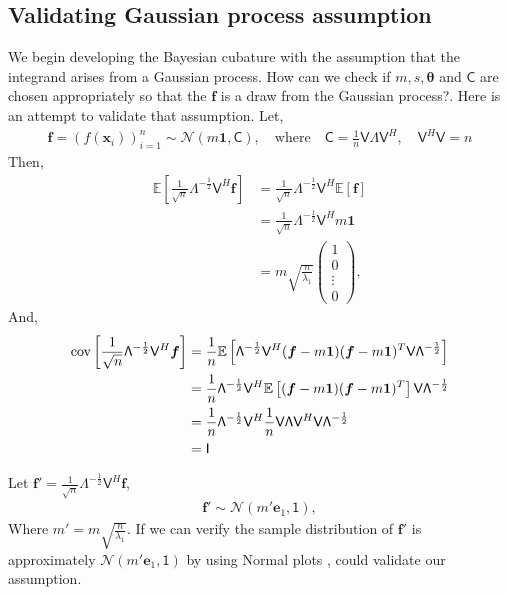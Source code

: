 \documentclass[smallextended]{svjour3}       %
\newcommand{\bm}[1]{\boldsymbol{#1}}
\newcommand{\Ex}{\mathbb{E}}
\newcommand{\vtheta}{{\bm{\theta}}}
\newcommand{\vf}{\bm{f}}
\newcommand{\vx}{\bm{x}}
\newcommand{\vone}{\bm{1}}
\newcommand{\mC}{\mathsf{C}}
\newcommand{\cov}{{\textup{cov}}}
\newcommand{\mLambda}{\mathsf{\Lambda}}
\newcommand{\mV}{\mathsf{V}}
\newcommand{\calN}{\mathcal{N}}
\begin{document}
\subsection{Validating Gaussian process assumption}


We begin developing the Bayesian cubature with the assumption that the integrand arises from a Gaussian process. How can we check if $m, s, \vtheta$ and $\mC$ are chosen appropriately so that the $\vf$ is a draw from the Gaussian process?. Here is an attempt to validate that assumption. Let,
\begin{align*}
\vf = \left( f(\vx_i) \right)_{i=1}^n
\sim \calN \left( m\vone, \mC \right), 
\quad \text{where}\quad \mC = \frac 1n \mV \mLambda \mV^H, \quad \mV^H \mV = n
\end{align*}
Then,
\begin{align*}
\Ex\left[ \frac{1}{\sqrt{n}} \mLambda^{-\frac 12} \mV^H \vf \right]
& =
\frac{1}{\sqrt{n}} \mLambda^{-\frac 12} \mV^H \Ex[\vf] 
\\
& =
\frac{1}{\sqrt{n}} \mLambda^{-\frac 12} \mV^H m \vone
\\
& = m \sqrt{\frac{n}{\lambda_1}} \left( 
\begin{array}{c}
1 \\ 0 \\ \vdots \\ 0
\end{array}
\right),
\end{align*}
And,
\begin{align*}
\cov \left[ \frac{1}{\sqrt{n}} \mLambda^{-\frac 12} \mV^H \vf  \right]
&=
\frac{1}{n} \Ex\left[  
\mLambda^{-\frac 12} \mV^H (\vf - m \vone)
(\vf - m \vone)^T \mV \mLambda^{-\frac 12}
\right]
\\
&=
\frac{1}{n} \mLambda^{-\frac 12} \mV^H 
\Ex\left[ (\vf - m \vone)
(\vf - m \vone)^T \right] \mV \mLambda^{-\frac 12}
\\
&=
\frac{1}{n} \mLambda^{-\frac 12} \mV^H 
\frac 1n \mV \mLambda \mV^H \mV \mLambda^{-\frac 12}
\\
& = \mathsf{I}
\end{align*}

Let $\vf' = \frac{1}{\sqrt{n}} \mLambda^{-\frac 12} \mV^H \vf$,
\begin{align*}
\vf' \sim \calN \left( 
m' \bm{e}_1,
\mathsf{1}
\right),
\end{align*}
Where $m' = m \sqrt{\frac{n}{\lambda_1}} $.
If we can verify the sample distribution of $\vf'$ is approximately $\calN\left( m' \bm{e}_1, \mathsf{1} \right)$ by using Normal plots , could validate our assumption.
\end{document}
